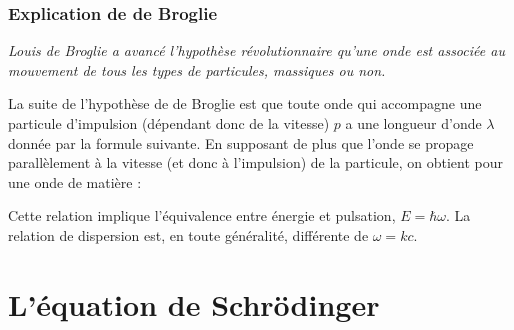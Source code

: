\documentclass[11pt]{book}
\begin{document}
\subsection{Explication de de Broglie}
\begin{center}
\textit{Louis de Broglie a avancé l'hypothèse révolutionnaire qu'une onde est associée au mouvement de tous les types de particules, massiques ou non.}\end{center}
La suite de l'hypothèse de de Broglie est que toute onde qui accompagne une particule d'impulsion (dépendant donc de la vitesse) $p$ a une longueur d'onde $\lambda$ donnée par la formule suivante. En supposant de plus que l'onde se propage parallèlement à la vitesse (et donc à l'impulsion) de la particule, on obtient pour une onde de matière :

Cette relation implique l'équivalence entre énergie et pulsation, $E = \hbar \omega$. La relation de dispersion est, en toute généralité, différente de $\omega = kc$.

\chapter{L'équation de Schrödinger}
\end{document}
